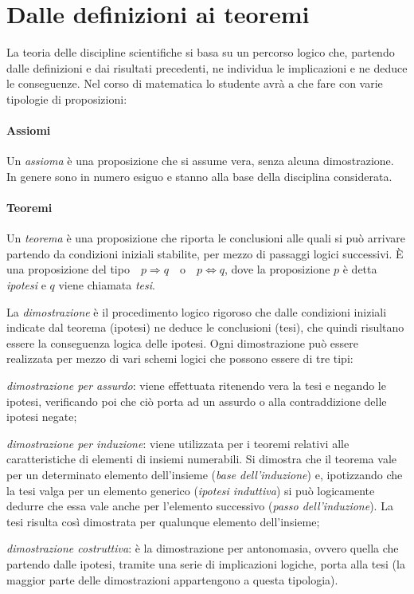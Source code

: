 \section{Dalle definizioni ai teoremi}

La teoria delle discipline scientifiche si basa su un percorso logico che, partendo dalle definizioni e dai risultati precedenti, ne individua le implicazioni e ne deduce le conseguenze. Nel corso di matematica lo studente avrà a che fare con varie tipologie di proposizioni:

\paragraph{Assiomi}
Un \emph{assioma} è una proposizione che si assume vera, senza alcuna dimostrazione. In genere sono in numero esiguo e stanno alla base della disciplina considerata.

\paragraph{Teoremi}
Un \emph{teorema} è una proposizione che riporta le conclusioni alle quali si può arrivare partendo da condizioni iniziali stabilite, per mezzo di passaggi logici successivi. \`E una proposizione del tipo\ \  $p\Rightarrow q$\ \ o\ \ $p \Leftrightarrow q$, dove la proposizione $p$ è detta \emph{ipotesi} e $q$ viene chiamata \emph{tesi}.

La \emph{dimostrazione} è il procedimento logico rigoroso che dalle condizioni iniziali indicate dal teorema (ipotesi) ne deduce le conclusioni (tesi), che quindi risultano essere la conseguenza logica delle ipotesi.
Ogni dimostrazione può essere realizzata per mezzo di vari schemi logici che possono essere di tre tipi:

\begin{itemize*}
\item \emph{dimostrazione per assurdo}: viene effettuata ritenendo vera la tesi e negando le ipotesi, verificando poi che ciò porta ad un assurdo o alla contraddizione delle ipotesi negate;
\item \emph{dimostrazione per induzione}: viene utilizzata per i teoremi relativi alle caratteristiche di elementi di insiemi numerabili. Si dimostra che il teorema vale per un determinato elemento dell'insieme (\emph{base dell'induzione}) e, ipotizzando che la tesi valga per un elemento generico (\emph{ipotesi induttiva}) si può logicamente dedurre che essa vale anche per l'elemento successivo (\emph{passo dell'induzione}). La tesi risulta così dimostrata per qualunque elemento dell'insieme;
\item \emph{dimostrazione costruttiva}: è la dimostrazione per antonomasia, ovvero quella che partendo dalle ipotesi, tramite una serie di implicazioni logiche, porta alla tesi (la maggior parte delle dimostrazioni appartengono a questa tipologia).
\end{itemize*}

